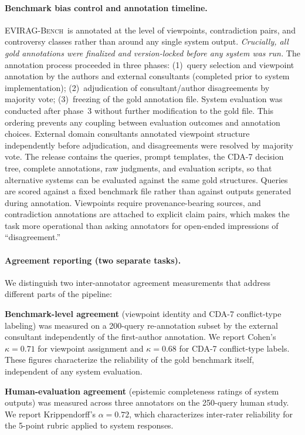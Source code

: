 \documentclass[11pt]{article}
\newcommand{\bench}{\textsc{EVIRAG-Bench}\xspace}
\begin{document}
\paragraph{Benchmark bias control and annotation timeline.}
\bench\ is annotated at the level of viewpoints, contradiction pairs, and
controversy classes rather than around any single system output.
\emph{Crucially, all gold annotations were finalized and version-locked before
any system was run.}  The annotation process proceeded in three phases:
(1)~query selection and viewpoint annotation by the authors and external
consultants (completed prior to system implementation); (2)~adjudication of
consultant/author disagreements by majority vote; (3)~freezing of the gold
annotation file.  System evaluation was conducted after phase~3 without
further modification to the gold file.  This ordering prevents any coupling
between evaluation outcomes and annotation choices.
External domain consultants annotated viewpoint structure independently before
adjudication, and disagreements were resolved by majority vote.  The release contains the queries, prompt templates, the CDA-7 decision tree,
complete annotations, raw judgments, and evaluation scripts, so that
alternative systems can be evaluated against the same gold structures.  Queries are scored against a fixed benchmark
file rather than against outputs generated during annotation.
Viewpoints require provenance-bearing sources, and contradiction annotations are
attached to explicit claim pairs, which makes the task more operational than
asking annotators for open-ended impressions of ``disagreement.''

\paragraph{Agreement reporting (two separate tasks).}
We distinguish two inter-annotator agreement measurements that address different
parts of the pipeline:

\textbf{Benchmark-level agreement} (viewpoint identity and CDA-7 conflict-type
labeling) was measured on a 200-query re-annotation subset by the external
consultant independently of the first-author annotation.  We report
Cohen's $\kappa{=}0.71$ for viewpoint assignment and $\kappa{=}0.68$ for
CDA-7 conflict-type labels.  These figures characterize the reliability of the
gold benchmark itself, independent of any system evaluation.

\textbf{Human-evaluation agreement} (epistemic completeness ratings of system
outputs) was measured across three annotators on the 250-query human study.
We report Krippendorff's $\alpha{=}0.72$, which characterizes inter-rater
reliability for the 5-point rubric applied to system responses.
\end{document}
